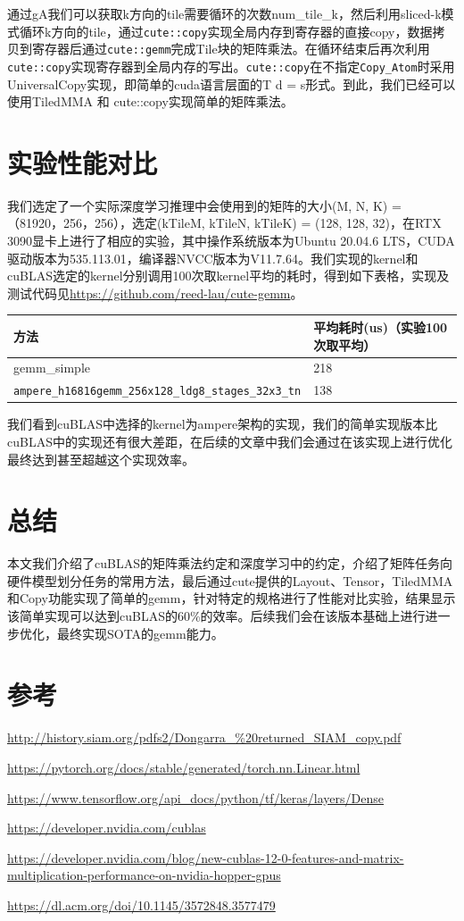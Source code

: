 通过gA我们可以获取k方向的tile需要循环的次数num\_tile\_k，然后利用sliced-k模式循环k方向的tile，通过\lstinline|cute::copy|实现全局内存到寄存器的直接copy，数据拷贝到寄存器后通过\lstinline|cute::gemm|完成Tile块的矩阵乘法。在循环结束后再次利用\lstinline|cute::copy|实现寄存器到全局内存的写出。\lstinline|cute::copy|在不指定\lstinline|Copy_Atom|时采用UniversalCopy实现，即简单的cuda语言层面的T d = s形式。到此，我们已经可以使用TiledMMA 和 cute::copy实现简单的矩阵乘法。

\section{实验性能对比}

我们选定了一个实际深度学习推理中会使用到的矩阵的大小(M, N, K) = （81920，256，256），选定(kTileM, kTileN, kTileK) = (128, 128, 32)，在RTX 3090显卡上进行了相应的实验，其中操作系统版本为Ubuntu 20.04.6 LTS，CUDA 驱动版本为535.113.01，编译器NVCC版本为V11.7.64。我们实现的kernel和cuBLAS选定的kernel分别调用100次取kernel平均的耗时，得到如下表格，实现及测试代码见\url{https://github.com/reed-lau/cute-gemm}。

\begin{table}[htbp]
\centering
\begin{tabular}{ll}
\toprule
方法 & 平均耗时(us)（实验100次取平均） \\
\midrule
gemm\_simple & 218 \\
\lstinline|ampere_h16816gemm_256x128_ldg8_stages_32x3_tn| & 138 \\
\bottomrule
\end{tabular}
\end{table}

我们看到cuBLAS中选择的kernel为ampere架构的实现，我们的简单实现版本比cuBLAS中的实现还有很大差距，在后续的文章中我们会通过在该实现上进行优化最终达到甚至超越这个实现效率。

\section{总结}

本文我们介绍了cuBLAS的矩阵乘法约定和深度学习中的约定，介绍了矩阵任务向硬件模型划分任务的常用方法，最后通过cute提供的Layout、Tensor，TiledMMA和Copy功能实现了简单的gemm，针对特定的规格进行了性能对比实验，结果显示该简单实现可以达到cuBLAS的60\%的效率。后续我们会在该版本基础上进行进一步优化，最终实现SOTA的gemm能力。

\section{参考}

\url{http://history.siam.org/pdfs2/Dongarra_%20returned_SIAM_copy.pdf}

\url{https://pytorch.org/docs/stable/generated/torch.nn.Linear.html}

\url{https://www.tensorflow.org/api_docs/python/tf/keras/layers/Dense}

\url{https://developer.nvidia.com/cublas}

\url{https://developer.nvidia.com/blog/new-cublas-12-0-features-and-matrix-multiplication-performance-on-nvidia-hopper-gpus}

\url{https://dl.acm.org/doi/10.1145/3572848.3577479}
